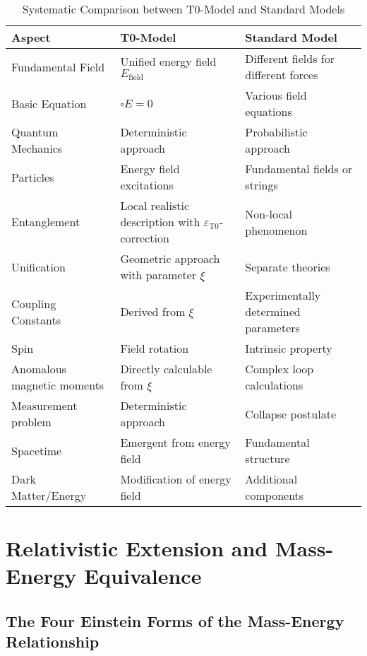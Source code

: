 \documentclass[12pt,a4paper]{article}
\newcommand{\efield}{E_{\text{field}}}
\newcommand{\epst}{\varepsilon_{\text{T0}}}
\theoremstyle{definition}
\begin{document}
	\begin{table}[h]
		\centering
		\begin{tabular}{p{3cm}p{5cm}p{5cm}}
			\toprule
			\textbf{Aspect} & \textbf{T0-Model} & \textbf{Standard Model} \\
			\midrule
			Fundamental Field & Unified energy field $\efield$ & Different fields for different forces \\
			\addlinespace
			Basic Equation & $\square E = 0$ & Various field equations \\
			\addlinespace
			Quantum Mechanics & Deterministic approach & Probabilistic approach \\
			\addlinespace
			Particles & Energy field excitations & Fundamental fields or strings \\
			\addlinespace
			Entanglement & Local realistic description with $\epst$-correction & Non-local phenomenon \\
			\addlinespace
			Unification & Geometric approach with parameter $\xi$ & Separate theories \\
			\addlinespace
			Coupling Constants & Derived from $\xi$ & Experimentally determined parameters \\
			\addlinespace
			Spin & Field rotation & Intrinsic property \\
			\addlinespace
			Anomalous magnetic moments & Directly calculable from $\xi$ & Complex loop calculations \\
			\addlinespace
			Measurement problem & Deterministic approach & Collapse postulate \\
			\addlinespace
			Spacetime & Emergent from energy field & Fundamental structure \\
			\addlinespace
			Dark Matter/Energy & Modification of energy field & Additional components \\
			\bottomrule
		\end{tabular}
		\caption{Systematic Comparison between T0-Model and Standard Models}
	\end{table}
	
	\section{Relativistic Extension and Mass-Energy Equivalence}
	
	\subsection{The Four Einstein Forms of the Mass-Energy Relationship}
	
\end{document}
